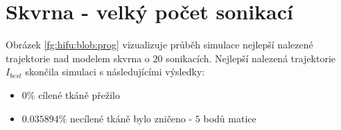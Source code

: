\section{Skvrna - velký počet sonikací}
Obrázek \ref{fg:hifu:blob:prog} vizualizuje průběh simulace nejlepší nalezené trajektorie nad modelem skvrna o $20$ sonikacích. Nejlepší nalezená trajektorie $I_{best}$ skončila simulaci s následujícími výsledky:
\begin{center}
\begin{itemize}
    \item $0\%$ cílené tkáně přežilo
    \item $0.035894\%$ necílené tkáně bylo zničeno - $5$ bodů matice
\end{itemize}
\end{center}


\begin{figure}[H]
\end{figure}
